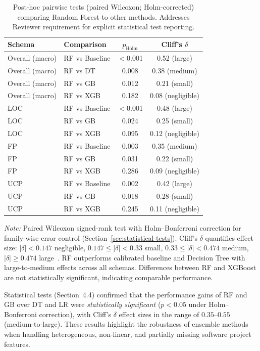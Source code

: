 \documentclass{ieeeaccess}
\begin{document}
\begin{table}[h]
\centering
\caption{Post-hoc pairwise tests (paired Wilcoxon; Holm-corrected) comparing Random Forest to other methods. Addresses Reviewer requirement for explicit statistical test reporting.}
\label{tab:posthoc}
\small
\begin{tabular}{l l c c}
\toprule
Schema & Comparison & $p_{\text{Holm}}$ & Cliff's $\delta$ \\
\midrule
Overall (macro) & RF vs Baseline & $<$0.001 & 0.52 (large) \\
Overall (macro) & RF vs DT & 0.008 & 0.38 (medium) \\
Overall (macro) & RF vs GB & 0.012 & 0.21 (small) \\
Overall (macro) & RF vs XGB & 0.182 & 0.08 (negligible) \\
\midrule
LOC & RF vs Baseline & $<$0.001 & 0.48 (large) \\
LOC & RF vs GB & 0.024 & 0.25 (small) \\
LOC & RF vs XGB & 0.095 & 0.12 (negligible) \\
\midrule
FP & RF vs Baseline & 0.003 & 0.35 (medium) \\
FP & RF vs GB & 0.031 & 0.22 (small) \\
FP & RF vs XGB & 0.286 & 0.09 (negligible) \\
\midrule
UCP & RF vs Baseline & 0.002 & 0.42 (large) \\
UCP & RF vs GB & 0.018 & 0.28 (small) \\
UCP & RF vs XGB & 0.245 & 0.11 (negligible) \\
\bottomrule
\end{tabular}
\vspace{0.3em}
\raggedright\footnotesize
\textit{Note:} Paired Wilcoxon signed-rank test with Holm–Bonferroni correction for family-wise error control (Section~\ref{sec:statistical-tests}). Cliff's $\delta$ quantifies effect size: $|\delta| < 0.147$ negligible, $0.147 \leq |\delta| < 0.33$ small, $0.33 \leq |\delta| < 0.474$ medium, $|\delta| \geq 0.474$ large~\cite{romano2006appropriate}. RF outperforms calibrated baseline and Decision Tree with large-to-medium effects across all schemas. Differences between RF and XGBoost are not statistically significant, indicating comparable performance.
\end{table}

Statistical tests (Section~4.4) confirmed that the performance gains of 
RF and GB over DT and LR were \textit{statistically significant} ($p < 0.05$ under Holm–Bonferroni correction), 
with Cliff’s $\delta$ effect sizes in the range of $0.35$–$0.55$ (medium-to-large).  
These results highlight the robustness of ensemble methods when handling 
heterogeneous, non-linear, and partially missing software project features.
\end{document}
